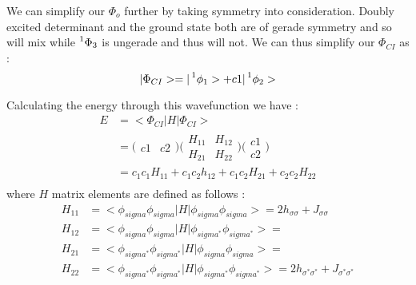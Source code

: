 \documentclass[11pt]{article}   	%
\begin{document}
	We can simplify our $\Phi_o$ further by taking symmetry into consideration. Doubly excited determinant and the ground state both are of 
	gerade symmetry and so will mix while $\prescript{1}{}{\Phi_3}$ is ungerade and thus will not. We can thus simplify our $\Phi_{CI}$ as :\\
	\begin{equation}
		|\Phi_{CI}>=|\prescript{1}{}{\phi_1}>+c1|\prescript{1}{}{\phi_2}>
	\end{equation}
	
	Calculating the energy through this wavefunction we have :\\
	\begin{equation}
	\begin{split}
		E&=<\Phi_{CI}|H|\Phi_{CI}>\\
		 &=\big( \begin{matrix} c1 & c2 \end{matrix} \big)\bigg(\begin{matrix} H_{11} & H_{12} \\ H_{21} & H_{22} \end{matrix}\bigg)
			 \bigg( \begin{matrix} c1\\c2\end{matrix}\bigg)\\
		 &=c_1c_1H_{11}+c_1c_2h_{12}+c_1c_2H_{21}+c_2c_2H_{22}\\
	\end{split}
	\end{equation}
	where $H$ matrix elements are defined as follows :\\
	\begin{equation}
	\begin{split}
		H_{11}&=<\phi_{sigma}\phi_{sigma}|H|\phi_{sigma}\phi_{sigma}>=2 h_{\sigma\sigma}+J_{\sigma\sigma}\\
		H_{12}&=<\phi_{sigma}\phi_{sigma}|H|\phi_{sigma^*}\phi_{sigma^*}>=\\
		H_{21}&=<\phi_{sigma^*}\phi_{sigma^*}|H|\phi_{sigma}\phi_{sigma}>=\\
		H_{22}&=<\phi_{sigma^*}\phi_{sigma^*}|H|\phi_{sigma^*}\phi_{sigma^*}>=2 h_{\sigma^*\sigma^*}+J_{\sigma^*\sigma^*}\\
	\end{split}
	\end{equation}
\end{document}
